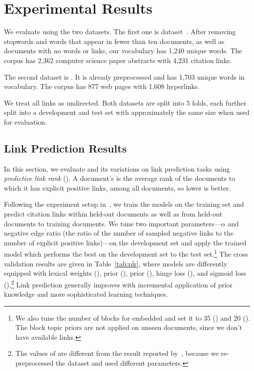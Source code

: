 \section{Experimental Results}
\label{sec:experiments}

We evaluate using the two datasets. The first one is \cora dataset~\cite{mccallum-2000-cora}.  After
removing stopwords and words that appear in fewer than ten documents,
as well as documents with no words or links, our vocabulary has
1,240 unique words.  The corpus has 2,362 computer science paper abstracts
with 4,231 citation links.

The second dataset is \webkb. It is already preprocessed and has 1,703 unique words in vocabulary.
The corpus has 877 web pages with 1,608 hyperlinks.

We treat all links as undirected. Both datasets are split into 5 folds, each further split into a development and
test set with approximately the same size when used for evaluation.

\subsection{Link Prediction Results}
\label{ssec:plr}

In this section, we evaluate \lexwsbmedrtm and its variations on link
prediction tasks using \emph{predictive link rank} (\plr).  A
document's \plr is the average rank of the documents to which it has
explicit positive links, among all documents, so lower \plr is better.

Following the experiment setup in~, we train the models
on the training set and predict citation links within held-out documents as well
as from held-out documents to training documents. We tune two important
parameters---$\alpha$ and negative edge ratio (the ratio of the number of
sampled negative links to the number of explicit positive links)---on the
development set and apply the trained model which performs the best on the
development set to the test set.\footnote{We also tune the number of blocks for
  embedded \wsbm and set it to 35 (\cora) and 20 (\webkb). The block topic
  priors are not applied on unseen documents, since we don't have available
  links.}  The cross validation results are given in Table~\ref{tab:plr}, where
models are differently equipped with lexical weights (\lex), \wsbm prior (\wsb),
\scc prior (\sccprefix), hinge loss (\med), and sigmoid loss
(\sigmoid).\footnote{The values of \rtm are different from the result reported
  by~, because we re-preprocessed the \cora dataset and
  used different parameters.}  Link prediction generally improves with
incremental application of prior knowledge and more sophisticated learning
techniques.


